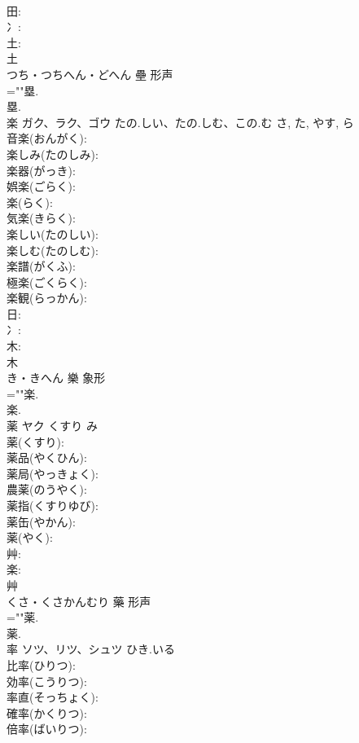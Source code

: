 \documentclass[8pt]{extreport}
\begin{document}
\begin{CJK}{UTF8}{min}
\\	田: 
\\	冫: 
\\	土: 
\\	土	
\\	つち・つちへん・どへん	壘	形声 
\\	=""塁.
\\	塁.
\\	楽	ガク、ラク、ゴウ	たの.しい、たの.しむ、この.む	さ, た, やす, ら	
\\	音楽(おんがく): 
\\	楽しみ(たのしみ): 
\\	楽器(がっき): 
\\	娯楽(ごらく): 
\\	楽(らく): 
\\	気楽(きらく): 
\\	楽しい(たのしい): 
\\	楽しむ(たのしむ): 
\\	楽譜(がくふ): 
\\	極楽(ごくらく): 
\\	楽観(らっかん): 
\\	日: 
\\	冫: 
\\	木: 
\\	木	
\\	き・きへん	樂	象形 
\\	=""楽.
\\	楽.
\\	薬	ヤク	くすり	み	
\\	薬(くすり): 
\\	薬品(やくひん): 
\\	薬局(やっきょく): 
\\	農薬(のうやく): 
\\	薬指(くすりゆび): 
\\	薬缶(やかん): 
\\	薬(やく): 
\\	艸: 
\\	楽: 
\\	艸	
\\	くさ・くさかんむり	藥	形声 
\\	=""薬.
\\	薬.
\\	率	ソツ、リツ、シュツ	ひき.いる		
\\	比率(ひりつ): 
\\	効率(こうりつ): 
\\	率直(そっちょく): 
\\	確率(かくりつ): 
\\	倍率(ばいりつ): 

\end{CJK}
\end{document}
